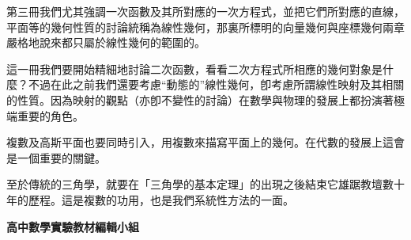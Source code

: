 第三冊我們尤其強調一次函數及其所對應的一次方程式，並把它們所對應的直線，平面等的幾何性質的討論統稱為線性幾何，那裏所標明的向量幾何與座標幾何兩章嚴格地說來都只屬於線性幾何的範圍的。

這一冊我們要開始精細地討論二次函數，看看二次方程式所相應的幾何對象是什麼？不過在此之前我們還要考慮“動態的”線性幾何，卽考慮所謂線性映射及其相關的性質。因為映射的觀點（亦卽不變性的討論）在數學與物理的發展上都扮演著極端重要的角色。

複數及高斯平面也要同時引入，用複數來描寫平面上的幾何。在代數的發展上這會是一個重要的關鍵。

至於傳統的三角學，就要在「三角學的基本定理」的出現之後結束它雄踞教壇數十年的歷程。這是複數的功用，也是我們系統性方法的一面。

\vspace{2em}
\begin{flushright}
\textbf{高中數學實驗教材編輯小組}
\end{flushright}
